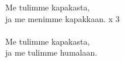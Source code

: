 
Me tulimme kapakasta, \\ ja me menimme kapakkaan. x 3 \\ \hspace{10mm} \\ Me tulimme kapakasta, \\ ja me tulimme humalaan.